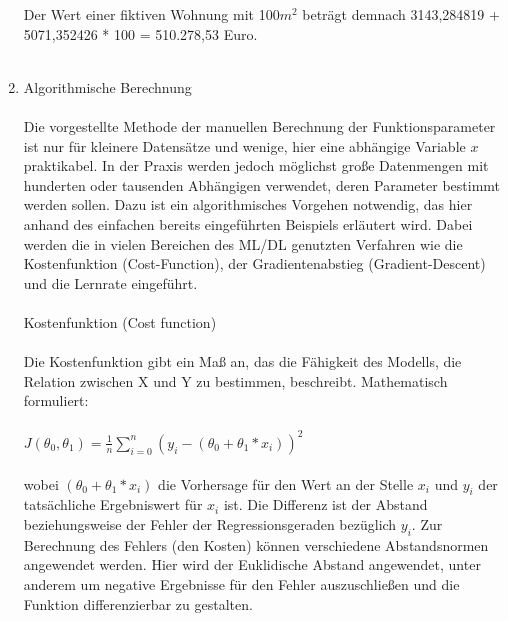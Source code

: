 \documentclass[a4paper]{scrreprt}
\begin{document}
\begin{enumerate}
%
%
Der Wert einer fiktiven Wohnung mit 100$m^2$ beträgt demnach 3143,284819 + 5071,352426 * 100 = 510.278,53 Euro.\\\\
\item Algorithmische Berechnung\\\\
Die vorgestellte Methode der manuellen Berechnung der Funktionsparameter ist nur für kleinere Datensätze und wenige, hier eine abhängige Variable ${x}$ praktikabel. In der Praxis werden jedoch möglichst große Datenmengen mit hunderten oder tausenden Abhängigen verwendet, deren Parameter bestimmt werden sollen. Dazu ist ein algorithmisches Vorgehen notwendig, das hier anhand des einfachen bereits eingeführten Beispiels erläutert wird. Dabei werden die in vielen Bereichen des ML/DL genutzten Verfahren wie die Kostenfunktion (Cost-Function), der Gradientenabstieg (Gradient-Descent) und die Lernrate eingeführt.\\\\
Kostenfunktion (Cost function)\\\\
Die Kostenfunktion gibt ein Maß an, das die Fähigkeit des Modells, die Relation zwischen X und Y zu bestimmen, beschreibt. Mathematisch formuliert:\\\\
$J(\theta_{0},\theta_{1})=\frac{1}{n}\sum_{i=0}^{n}(y_{i}-(\theta_{0}+\theta_{1}*x_{i}))^{2}$\\\\
wobei $(\theta_{0}+\theta_{1}*x_i)$ die Vorhersage für den Wert an der Stelle $x_i$ und $y_i$ der tatsächliche Ergebniswert für $x_i$ ist. Die Differenz ist der Abstand beziehungsweise der Fehler der Regressionsgeraden bezüglich $y_i$. Zur Berechnung des Fehlers (den Kosten) können verschiedene Abstandsnormen angewendet werden. Hier wird der Euklidische Abstand angewendet, unter anderem um negative Ergebnisse für den Fehler auszuschließen und die Funktion differenzierbar zu gestalten.

\end{enumerate}
\end{document}
